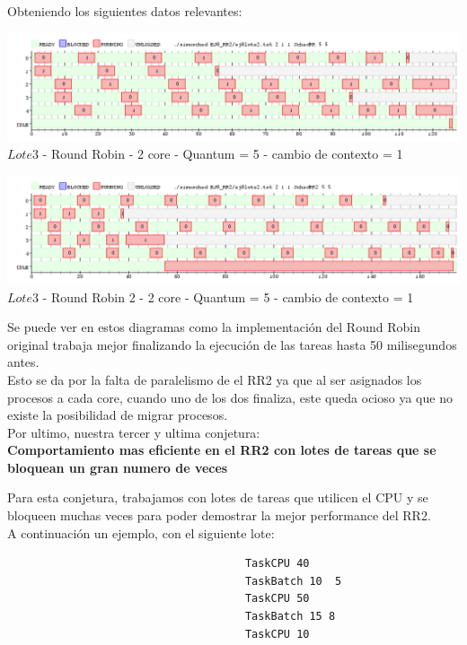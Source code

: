 Obteniendo los siguientes datos relevantes:\\

\begin{center}
    	\includegraphics[width=450pt]{./EJ8_RR2/dif10corerr.png}
	{$Lote 3$ - Round Robin - 2 core - Quantum = 5 - cambio de contexto = 1}	
 \end{center}
 
 \begin{center}
    	\includegraphics[width=450pt]{./EJ8_RR2/dif10corerr2.png}
	{$Lote 3$ - Round Robin 2 - 2 core - Quantum = 5 - cambio de contexto = 1}	
 \end{center}
 
 Se puede ver en estos diagramas como la implementación del Round Robin original trabaja
 mejor finalizando la ejecución de las tareas hasta 50 milisegundos antes.\\
 Esto se da por la falta de paralelismo de el RR2 ya que al ser asignados los procesos
 a cada core, cuando uno de los dos finaliza, este queda ocioso ya que no existe la
 posibilidad de migrar  procesos.\\
 
 Por ultimo, nuestra tercer y ultima conjetura:\\
 
 \textbf{Comportamiento mas eficiente en el RR2 con lotes de tareas que se bloquean un gran numero
de veces}

Para esta conjetura, trabajamos con lotes de tareas que utilicen el CPU y se bloqueen muchas
veces para poder demostrar la mejor performance del RR2.\\

A continuación un ejemplo, con el siguiente lote:

\begin{verbatim}
                                     TaskCPU 40
                                     TaskBatch 10  5
                                     TaskCPU 50
                                     TaskBatch 15 8
                                     TaskCPU 10

\end{verbatim}


